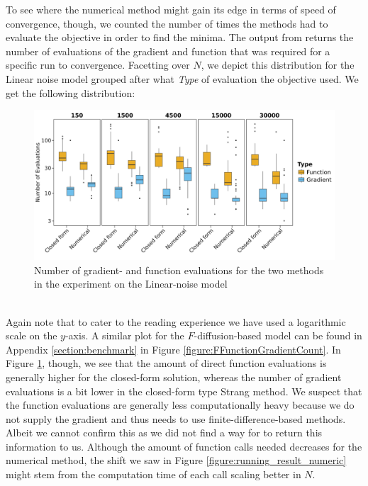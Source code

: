 To see where the numerical method might gain its edge in terms of speed of convergence, though, we counted the number of times the methods had to evaluate the objective in order to find the minima. The  output from  returns the number of evaluations of the gradient and function that was required for a specific run to convergence. Facetting over $N$, we depict this distribution for the Linear noise model grouped after what \textit{Type} of evaluation the objective used. We get the following distribution:
\begin{figure}[h!]
    \begin{center}
    \includegraphics[scale = .08]{figures/function_gradient_count_Linear_plot.jpeg}     
    \caption{Number of gradient- and function evaluations for the two methods in the experiment on the Linear-noise model}
    \label{figure:linearFunctionGradientCount}   
    \end{center}
\end{figure}\\
Again note that to cater to the reading experience we have used a logarithmic scale on the $y$-axis. A similar plot for the $F$-diffusion-based model can be found in Appendix \ref{section:benchmark} in Figure \ref{figure:FFunctionGradientCount}. In Figure \ref{figure:linearFunctionGradientCount}, though, we see that the amount of direct function evaluations is generally higher for the closed-form solution, whereas the number of gradient evaluations is a bit lower in the closed-form type Strang method. We suspect that the function evaluations are generally less computationally heavy because we do not supply the gradient and  thus needs to use finite-difference-based methods. Albeit we cannot confirm this as we did not find a way for  to return this information to us. Although the amount of function calls needed decreases for the numerical method, the shift we saw in Figure \ref{figure:running_result_numeric} might stem from the computation time of each call scaling better in $N$.

